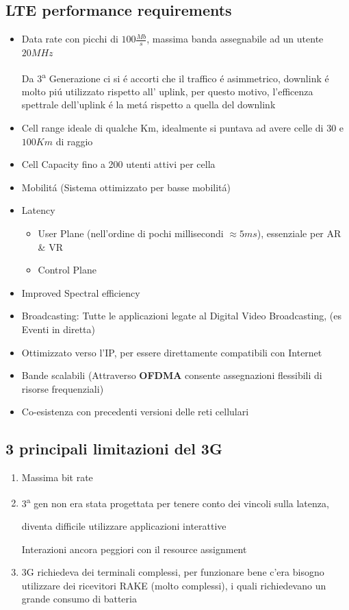 \documentclass{article}
\begin{document}
\subsection{LTE performance requirements}
\begin{itemize}
    \item Data rate con picchi di $100\frac{Mb}{s}$, massima banda assegnabile ad un utente $20MHz$

        Da 3\textsuperscript{a} Generazione ci si \'e accorti che il traffico \'e asimmetrico, downlink \'e molto pi\'u utilizzato rispetto all' uplink, per questo motivo, l'efficenza spettrale dell'uplink \'e la met\'a rispetto a quella del downlink

    \item Cell range ideale di qualche Km, idealmente si puntava ad avere celle di $30$ e $100Km$ di raggio

    \item Cell Capacity fino a 200 utenti attivi per cella
    \item Mobilit\'a (Sistema ottimizzato per basse mobilit\'a)
    \item Latency
        \begin{itemize}
            \item User Plane (nell'ordine di pochi millisecondi $\approx 5ms$), essenziale per AR \& VR
            \item Control Plane
        \end{itemize}

    \item Improved Spectral efficiency
    \item Broadcasting: Tutte le applicazioni legate al Digital Video Broadcasting, (es Eventi in diretta)
    \item Ottimizzato verso l'IP, per essere direttamente compatibili con Internet
    \item Bande scalabili (Attraverso \textbf{OFDMA} consente assegnazioni flessibili di risorse frequenziali)
    \item Co-esistenza con precedenti versioni delle reti cellulari
\end{itemize}

\subsection{3 principali limitazioni del 3G}
\begin{enumerate}
    \item Massima bit rate  %
    \item 3\textsuperscript{a} gen non era stata progettata per tenere conto dei vincoli sulla latenza,

        diventa difficile utilizzare applicazioni interattive

        Interazioni ancora peggiori con il resource assignment
    \item 3G richiedeva dei terminali complessi, per funzionare bene c'era bisogno utilizzare dei ricevitori RAKE (molto complessi), i quali richiedevano un grande consumo di batteria
\end{enumerate}
\end{document}
